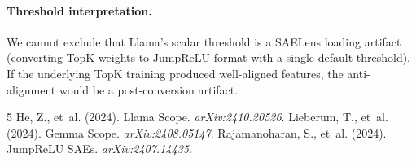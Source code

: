 \documentclass[11pt,a4paper]{article}
\begin{document}
\paragraph{Threshold interpretation.} We cannot exclude that Llama's scalar threshold is a SAELens loading artifact (converting TopK weights to JumpReLU format with a single default threshold). If the underlying TopK training produced well-aligned features, the anti-alignment would be a post-conversion artifact.


\begin{thebibliography}{5}
 He, Z., et~al. (2024). Llama Scope. \emph{arXiv:2410.20526}.
 Lieberum, T., et~al. (2024). Gemma Scope. \emph{arXiv:2408.05147}.
 Rajamanoharan, S., et~al. (2024). JumpReLU SAEs. \emph{arXiv:2407.14435}.
\end{thebibliography}
\end{document}
